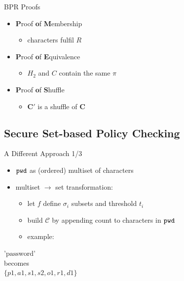 \documentclass[notes,xcolor=dvipsnames]{beamer}
\begin{document}
\begin{frame}{BPR Proofs}
  \begin{itemize}
    \item \textbf{P}roof \textbf{o}f \textbf{M}embership
    \begin{itemize}
      \item characters fulfil $R$
    \end{itemize}
    \vspace*{2em}
    \item \textbf{P}roof \textbf{o}f \textbf{E}quivalence
    \begin{itemize}
      \item $H_2$ and $C$ contain the same $\pi$
    \end{itemize}
    \vspace*{2em}
    \item \textbf{P}roof \textbf{o}f \textbf{S}huffle
    \begin{itemize}
      \item $\bm C'$ is a shuffle of $\bm C$ 
    \end{itemize}
    \vspace*{2em}
  \end{itemize}
\end{frame}

\subsection[SPC]{Secure Set-based Policy Checking}


\begin{frame}{A Different Approach 1/3}
  
  \begin{itemize}
    \item $\mathtt{pwd}$ as (ordered) multiset of characters
    \item multiset $\rightarrow$ set transformation:
    \begin{itemize}
      \item let $f$ define $\sigma_i$ subsets and threshold $t_i$
      \item build $\mathcal{C}$ by appending count to characters in $\mathtt{pwd}$
      \item example:
    \end{itemize}
  \end{itemize}
  \begin{center}{\Large $\text{'password'}$\\[1em]becomes\\[1em]$\{p1,a1,s1,s2,o1,r1,d1\}$}\end{center}
  
\end{frame}
\end{document}
